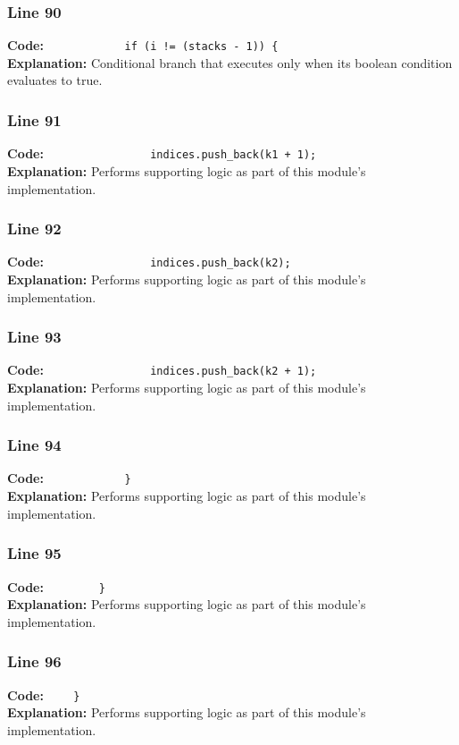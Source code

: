 \documentclass[11pt,a4paper]{article}
\begin{document}
\subsubsection*{Line 90}
\textbf{Code:} \verb|            if (i != (stacks - 1)) {|\\
\textbf{Explanation:} Conditional branch that executes only when its boolean condition evaluates to true.

\subsubsection*{Line 91}
\textbf{Code:} \verb|                indices.push_back(k1 + 1);|\\
\textbf{Explanation:} Performs supporting logic as part of this module's implementation.

\subsubsection*{Line 92}
\textbf{Code:} \verb|                indices.push_back(k2);|\\
\textbf{Explanation:} Performs supporting logic as part of this module's implementation.

\subsubsection*{Line 93}
\textbf{Code:} \verb|                indices.push_back(k2 + 1);|\\
\textbf{Explanation:} Performs supporting logic as part of this module's implementation.

\subsubsection*{Line 94}
\textbf{Code:} \verb|            }|\\
\textbf{Explanation:} Performs supporting logic as part of this module's implementation.

\subsubsection*{Line 95}
\textbf{Code:} \verb|        }|\\
\textbf{Explanation:} Performs supporting logic as part of this module's implementation.

\subsubsection*{Line 96}
\textbf{Code:} \verb|    }|\\
\textbf{Explanation:} Performs supporting logic as part of this module's implementation.
\end{document}
